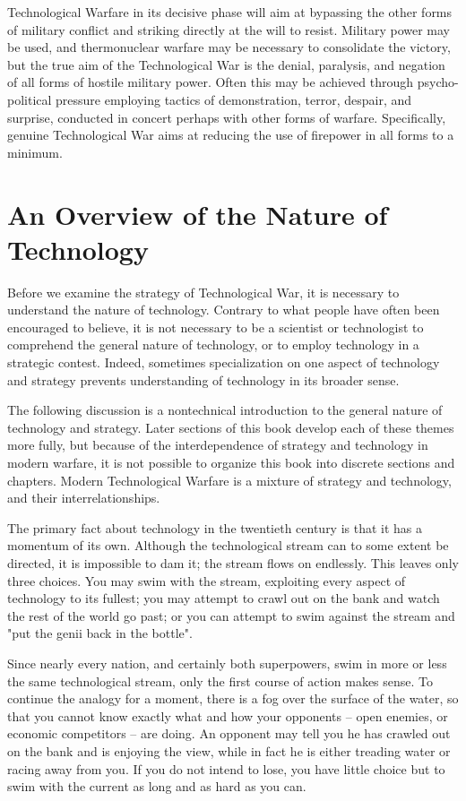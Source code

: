 Technological Warfare in its decisive phase will aim at bypassing the other forms of military conflict and striking directly at the will to resist. Military power may be used, and thermonuclear warfare may be necessary to consolidate the victory, but the true aim of the Technological War is the denial, paralysis, and negation of all forms of hostile military power. Often this may be achieved through psycho-political pressure employing tactics of demonstration, terror, despair, and surprise, conducted in concert perhaps with other forms of warfare. Specifically, genuine Technological War aims at reducing the use of firepower in all forms to a minimum.

\section{An Overview of the Nature of Technology}
Before we examine the strategy of Technological War, it is necessary to understand the nature of technology. Contrary to what people have often been encouraged to believe, it is not necessary to be a scientist or technologist to comprehend the general nature of technology, or to employ technology in a strategic contest. Indeed, sometimes specialization on one aspect of technology and strategy prevents understanding of technology in its broader sense.

The following discussion is a nontechnical introduction to the general nature of technology and strategy. Later sections of this book develop each of these themes more fully, but because of the interdependence of strategy and technology in modern warfare, it is not possible to organize this book into discrete sections and chapters. Modern Technological Warfare is a mixture of strategy and technology, and their interrelationships.

The primary fact about technology in the twentieth century is that it has a momentum of its own. Although the technological stream can to some extent be directed, it is impossible to dam it; the stream flows on endlessly. This leaves only three choices. You may swim with the stream, exploiting every aspect of technology to its fullest; you may attempt to crawl out on the bank and watch the rest of the world go past; or you can attempt to swim against the stream and "put the genii back in the bottle".

Since nearly every nation, and certainly both superpowers, swim in more or less the same technological stream, only the first course of action makes sense. To continue the analogy for a moment, there is a fog over the surface of the water, so that you cannot know exactly what and how your opponents -- open enemies, or economic competitors -- are doing. An opponent may tell you he has crawled out on the bank and is enjoying the view, while in fact he is either treading water or racing away from you. If you do not intend to lose, you have little choice but to swim with the current as long and as hard as you can.

